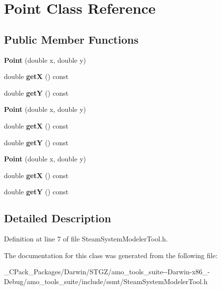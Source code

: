 \hypertarget{class_point}{}\section{Point Class Reference}
\label{class_point}
\subsection*{Public Member Functions}
\begin{DoxyCompactItemize}
\item 
\mbox{\label{class_point_a78b55e8d5466bb8c2cf60fa55f2562ff}} 
{\bfseries Point} (double x, double y)
\item 
\mbox{\label{class_point_a655794dd595a4821987664bf1d9010e8}} 
double {\bfseries getX} () const
\item 
\mbox{\label{class_point_aa323a12bec85e28ce6575dccec4f8b28}} 
double {\bfseries getY} () const
\item 
\mbox{\label{class_point_a78b55e8d5466bb8c2cf60fa55f2562ff}} 
{\bfseries Point} (double x, double y)
\item 
\mbox{\label{class_point_a655794dd595a4821987664bf1d9010e8}} 
double {\bfseries getX} () const
\item 
\mbox{\label{class_point_aa323a12bec85e28ce6575dccec4f8b28}} 
double {\bfseries getY} () const
\item 
\mbox{\label{class_point_a78b55e8d5466bb8c2cf60fa55f2562ff}} 
{\bfseries Point} (double x, double y)
\item 
\mbox{\label{class_point_a655794dd595a4821987664bf1d9010e8}} 
double {\bfseries getX} () const
\item 
\mbox{\label{class_point_aa323a12bec85e28ce6575dccec4f8b28}} 
double {\bfseries getY} () const
\end{DoxyCompactItemize}


\subsection{Detailed Description}


Definition at line 7 of file Steam\+System\+Modeler\+Tool.\+h.



The documentation for this class was generated from the following file\+:\begin{DoxyCompactItemize}
\item 
\+\_\+\+C\+Pack\+\_\+\+Packages/\+Darwin/\+S\+T\+G\+Z/amo\+\_\+tools\+\_\+suite-\/-\/\+Darwin-\/x86\+\_-\/\+Debug/amo\+\_\+tools\+\_\+suite/include/ssmt/Steam\+System\+Modeler\+Tool.\+h\end{DoxyCompactItemize}
